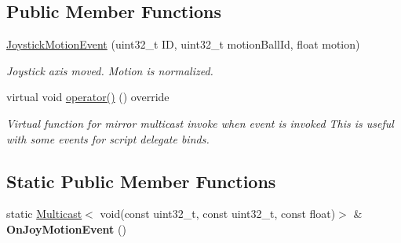 \subsection*{Public Member Functions}
\begin{DoxyCompactItemize}
\item 
\hyperlink{classJoystickMotionEvent_a877bb7736b43358c51e37e88f9670bcc}{Joystick\+Motion\+Event} (uint32\+\_\+t ID, uint32\+\_\+t motion\+Ball\+Id, float motion)
\begin{DoxyCompactList}\small\item\em Joystick axis moved. Motion is normalized. \end{DoxyCompactList}\item 
\mbox{\label{classJoystickMotionEvent_a9fe57cf10954a47116c5488f5ce82dbc}} 
virtual void \hyperlink{classJoystickMotionEvent_a9fe57cf10954a47116c5488f5ce82dbc}{operator()} () override
\begin{DoxyCompactList}\small\item\em Virtual function for mirror multicast invoke when event is invoked This is useful with some events for script delegate binds. \end{DoxyCompactList}\end{DoxyCompactItemize}
\subsection*{Static Public Member Functions}
\begin{DoxyCompactItemize}
\item 
\mbox{\label{classJoystickMotionEvent_a6a1b6f573bea444c187b8654c33e010b}} 
static \hyperlink{classMulticast}{Multicast}$<$ void(const uint32\+\_\+t, const uint32\+\_\+t, const float)$>$ \& {\bfseries On\+Joy\+Motion\+Event} ()
\end{DoxyCompactItemize}
